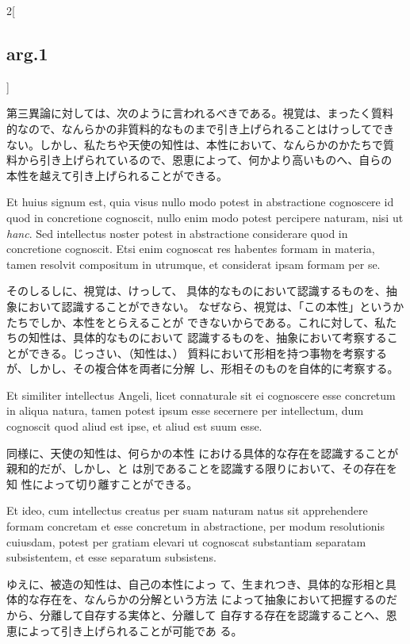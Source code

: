 \documentclass[paper=a4paper,fontsize=10pt,jafontsize=9pt,titlepage]{jlreq}
\begin{document}
\begin{paracol}{2}[\subsection{arg.1}]
\switchcolumn

第三異論に対しては、次のように言われるべきである。視覚は、まったく質料
的なので、なんらかの非質料的なものまで引き上げられることはけっしてでき
ない。しかし、私たちや天使の知性は、本性において、なんらかのかたちで質
料から引き上げられているので、恩恵によって、何かより高いものへ、自らの
本性を越えて引き上げられることができる。

\switchcolumn*

Et huius signum est, quia visus nullo modo potest in
abstractione cognoscere id quod in concretione cognoscit, nullo enim
modo potest percipere naturam, nisi ut {\itshape hanc}. Sed intellectus
noster potest in abstractione considerare quod in concretione
cognoscit. Etsi enim cognoscat res habentes formam in materia, tamen
resolvit compositum in utrumque, et considerat ipsam formam per se.

\switchcolumn

そのしるしに、視覚は、けっして、
具体的なものにおいて認識するものを、抽象において認識することができない。
なぜなら、視覚は、「この本性」というかたちでしか、本性をとらえることが
できないからである。これに対して、私たちの知性は、具体的なものにおいて
認識するものを、抽象において考察することができる。じっさい、（知性は、）
質料において形相を持つ事物を考察するが、しかし、その複合体を両者に分解
し、形相そのものを自体的に考察する。

\switchcolumn*

Et
similiter intellectus Angeli, licet connaturale sit ei cognoscere esse
concretum in aliqua natura, tamen potest ipsum esse secernere per
intellectum, dum cognoscit quod aliud est ipse, et aliud est suum
esse.

\switchcolumn

同様に、天使の知性は、何らかの本性
における具体的な存在を認識することが親和的だが、しかし、と
は別であることを認識する限りにおいて、その存在を知
性によって切り離すことができる。

\switchcolumn*

Et ideo, cum intellectus creatus per suam naturam natus sit
apprehendere formam concretam et esse concretum in abstractione, per
modum resolutionis cuiusdam, potest per gratiam elevari ut cognoscat
substantiam separatam subsistentem, et esse separatum subsistens.

\switchcolumn

ゆえに、被造の知性は、自己の本性によっ
て、生まれつき、具体的な形相と具体的な存在を、なんらかの分解という方法
によって抽象において把握するのだから、分離して自存する実体と、分離して
自存する存在を認識することへ、恩恵によって引き上げられることが可能であ
る。

\end{paracol}
\newpage
{}
\end{document}
